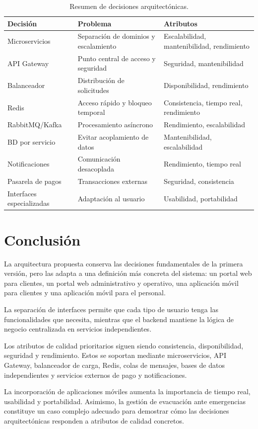 \documentclass[12pt,a4paper]{article}
\begin{document}
\begin{table}[H]
\centering
\small
\begin{tabular}{p{4cm}p{5cm}p{5cm}}
\toprule
\textbf{Decisión} & \textbf{Problema} & \textbf{Atributos}\\
\midrule
Microservicios & Separación de dominios y escalamiento & Escalabilidad, mantenibilidad, rendimiento\\
API Gateway & Punto central de acceso y seguridad & Seguridad, mantenibilidad\\
Balanceador & Distribución de solicitudes & Disponibilidad, rendimiento\\
Redis & Acceso rápido y bloqueo temporal & Consistencia, tiempo real, rendimiento\\
RabbitMQ/Kafka & Procesamiento asíncrono & Rendimiento, escalabilidad\\
BD por servicio & Evitar acoplamiento de datos & Mantenibilidad, escalabilidad\\
Notificaciones & Comunicación desacoplada & Rendimiento, tiempo real\\
Pasarela de pagos & Transacciones externas & Seguridad, consistencia\\
Interfaces especializadas & Adaptación al usuario & Usabilidad, portabilidad\\
\bottomrule
\end{tabular}
\caption{Resumen de decisiones arquitectónicas.}
\end{table}

\section{Conclusión}

La arquitectura propuesta conserva las decisiones fundamentales de la primera versión, pero las adapta a una definición más concreta del sistema: un portal web para clientes, un portal web administrativo y operativo, una aplicación móvil para clientes y una aplicación móvil para el personal.

La separación de interfaces permite que cada tipo de usuario tenga las funcionalidades que necesita, mientras que el backend mantiene la lógica de negocio centralizada en servicios independientes.

Los atributos de calidad prioritarios siguen siendo consistencia, disponibilidad, seguridad y rendimiento. Estos se soportan mediante microservicios, API Gateway, balanceador de carga, Redis, colas de mensajes, bases de datos independientes y servicios externos de pago y notificaciones.

La incorporación de aplicaciones móviles aumenta la importancia de tiempo real, usabilidad y portabilidad. Asimismo, la gestión de evacuación ante emergencias constituye un caso complejo adecuado para demostrar cómo las decisiones arquitectónicas responden a atributos de calidad concretos.
\end{document}
